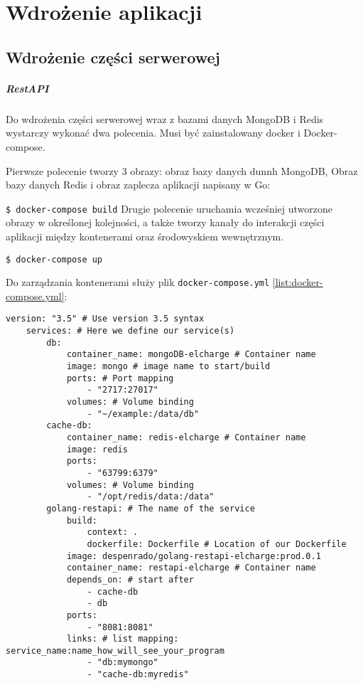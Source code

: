 \chapter{Wdrożenie aplikacji}
\section{Wdrożenie części serwerowej}
\paragraph{RestAPI}

Do wdrożenia części serwerowej wraz z bazami danych MongoDB i Redis wystarczy wykonać dwa polecenia.
Musi być zainstalowany docker i Docker-compose.

Pierwsze polecenie tworzy 3 obrazy: obraz bazy danych dunnh MongoDB, Obraz bazy danych Redis i obraz zaplecza aplikacji napisany w Go:

\texttt{\$ docker-compose build}
Drugie polecenie uruchamia wcześniej utworzone obrazy w określonej kolejności, a także tworzy kanały do interakcji części aplikacji między kontenerami oraz środowyskiem wewnętrznym.

\texttt{\$ docker-compose up}

Do zarządzania kontenerami służy plik \texttt{docker-compose.yml} \ref{list:docker-compose.yml}:
\begin{lstlisting}[label=list:docker-compose.yml,caption=docker-compose.yml,basicstyle=\tiny\ttfamily]
    version: "3.5" # Use version 3.5 syntax
    services: # Here we define our service(s)
        db:
            container_name: mongoDB-elcharge # Container name
            image: mongo # image name to start/build
            ports: # Port mapping
                - "2717:27017"
            volumes: # Volume binding
                - "~/example:/data/db"
        cache-db:
            container_name: redis-elcharge # Container name
            image: redis
            ports:
                - "63799:6379"
            volumes: # Volume binding
                - "/opt/redis/data:/data"
        golang-restapi: # The name of the service
            build:
                context: .
                dockerfile: Dockerfile # Location of our Dockerfile
            image: despenrado/golang-restapi-elcharge:prod.0.1
            container_name: restapi-elcharge # Container name
            depends_on: # start after
                - cache-db
                - db
            ports:
                - "8081:8081"
            links: # list mapping: service_name:name_how_will_see_your_program
                - "db:mymongo"
                - "cache-db:myredis"
    
\end{lstlisting}

